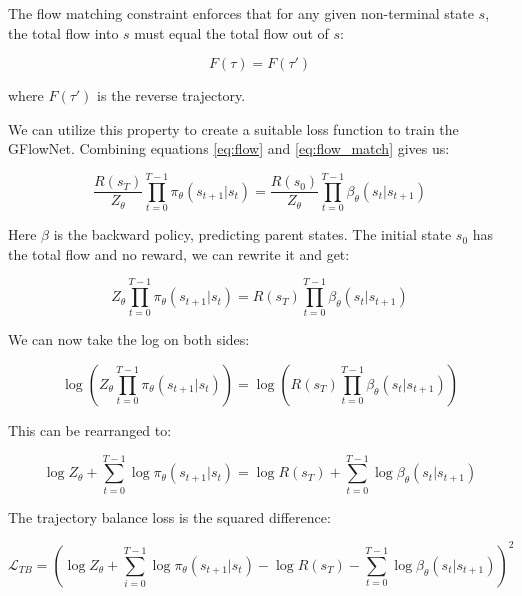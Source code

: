 The flow matching constraint enforces that for any given non-terminal state \( s \), the total flow into \( s \) must equal the total flow out of \( s \):

\begin{equation} \label{eq:flow_match}
    F(\tau) = F(\tau')
\end{equation}

where \( F(\tau') \) is the reverse trajectory.

We can utilize this property to create a suitable loss function to train the GFlowNet. Combining equations \ref{eq:flow} and \ref{eq:flow_match} gives us:

\begin{equation}
    \frac{R(s_T)}{Z_\theta} \prod_{t=0}^{T-1} \pi_\theta(s_{t+1} | s_{t}) = \frac{R(s_0)}{Z_\theta} \prod_{t=0}^{T-1} \beta_\theta(s_{t} | s_{t+1})
\end{equation}

Here \( \beta \) is the backward policy, predicting parent states. 
The initial state \(s_0\) has the total flow and no reward, we can rewrite it and get:

\begin{equation}
    Z_{\theta} \prod_{t=0}^{T-1} \pi_\theta(s_{t+1} | s_{t}) = R(s_T) \prod_{t=0}^{T-1} \beta_\theta(s_{t} | s_{t+1})
\end{equation}

We can now take the log on both sides:

\begin{equation}
    \log \left(Z_{\theta} \prod_{t=0}^{T-1} \pi_\theta(s_{t+1} | s_{t})\right) = \log \left(R(s_T) \prod_{t=0}^{T-1} \beta_\theta(s_{t} | s_{t+1})\right)
\end{equation}


This can be rearranged to:

\begin{equation}
    \log Z_\theta + \sum_{t=0}^{T-1} \log \pi_\theta(s_{t+1}|s_{t}) = \log R(s_T) + \sum_{t=0}^{T-1} \log \beta_\theta(s_{t}|s_{t+1})
\end{equation}

The trajectory balance loss is the squared difference:

\begin{equation}
    \mathcal{L}_{TB} = \left(\log Z_\theta + \sum_{i=0}^{T-1} \log \pi_\theta(s_{t+1}|s_{t}) - \log R(s_T) - \sum_{t=0}^{T-1} \log \beta_\theta(s_{t}|s_{t+1})\right)^2
\end{equation}

